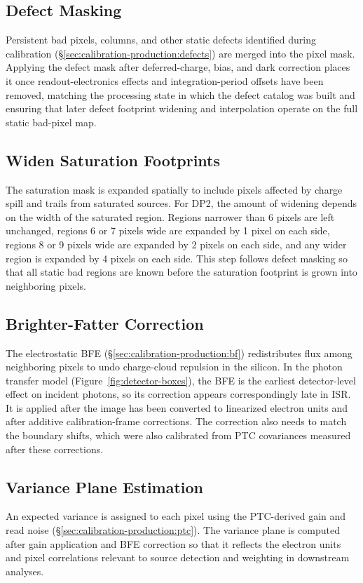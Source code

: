 \subsection{Defect Masking}
Persistent bad pixels, columns, and other static defects identified during calibration (\S\ref{sec:calibration-production:defects}) are merged into the pixel mask.
Applying the defect mask after deferred-charge, bias, and dark correction places it once readout-electronics effects and integration-period offsets have been removed, matching the processing state in which the defect catalog was built and ensuring that later defect footprint widening and interpolation operate on the full static bad-pixel map.

\subsection{Widen Saturation Footprints}
The saturation mask is expanded spatially to include pixels affected by charge spill and trails from saturated sources.
For DP2, the amount of widening depends on the width of the saturated region.
Regions narrower than 6 pixels are left unchanged, regions 6 or 7 pixels wide are expanded by 1 pixel on each side, regions 8 or 9 pixels wide are expanded by 2 pixels on each side, and any wider region is expanded by 4 pixels on each side.
This step follows defect masking so that all static bad regions are known before the saturation footprint is grown into neighboring pixels.

\subsection{Brighter-Fatter Correction}
The electrostatic BFE (\S\ref{sec:calibration-production:bf}) redistributes flux among neighboring pixels to undo charge-cloud repulsion in the silicon.
In the photon transfer model (Figure~\ref{fig:detector-boxes}), the BFE is the earliest detector-level effect on incident photons, so its correction appears correspondingly late in ISR.
It is applied after the image has been converted to linearized electron units and after additive calibration-frame corrections.
The correction also needs to match the boundary shifts, which were also calibrated from PTC covariances measured after these corrections.

\subsection{Variance Plane Estimation}
An expected variance is assigned to each pixel using the PTC-derived gain and read noise (\S\ref{sec:calibration-production:ptc}).
The variance plane is computed after gain application and BFE correction so that it reflects the electron units and pixel correlations relevant to source detection and weighting in downstream analyses.

